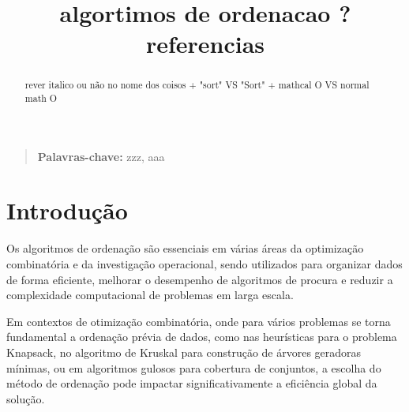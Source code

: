 \documentclass[conference]{IEEEtran}
\begin{document}
\title{algortimos de ordenacao ? referencias}

\author{
\and
{}
}

\maketitle
\thispagestyle{plain}

\begin{abstract}
rever italico ou não no nome dos coisos + "sort" VS "Sort" + mathcal O VS normal math O
\end{abstract}

\begin{quote}
\small
\noindent
\textbf{Palavras-chave:} zzz, aaa
\end{quote}

\IEEEpeerreviewmaketitle

\section{Introdução}

Os algoritmos de ordenação são essenciais em várias áreas da optimização combinatória e da investigação operacional, sendo utilizados para organizar dados de forma eficiente, melhorar o desempenho de algoritmos de procura e reduzir a complexidade computacional de problemas em larga escala.

Em contextos de otimização combinatória, onde para vários problemas se torna fundamental a ordenação prévia de dados, como nas heurísticas para o problema Knapsack, no algoritmo de Kruskal para construção de árvores geradoras mínimas, ou em algoritmos gulosos para cobertura de conjuntos, a escolha do método de ordenação pode impactar significativamente a eficiência global da solução.
\end{document}
